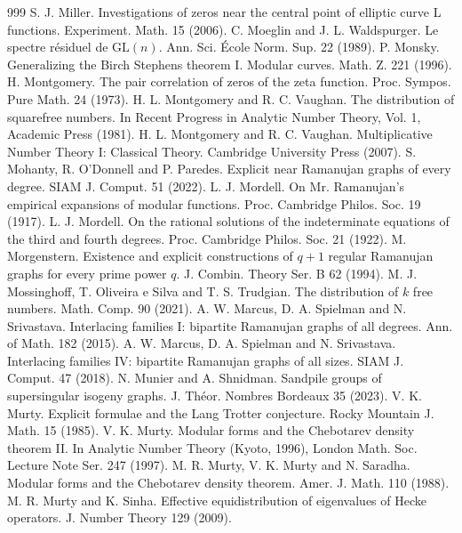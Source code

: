 \begin{thebibliography}{999}
 S. J. Miller. Investigations of zeros near the central point of elliptic curve L functions. Experiment. Math. 15 (2006).
 C. Moeglin and J. L. Waldspurger. Le spectre r\'esiduel de $\mathrm{GL}(n)$. Ann. Sci. \'Ecole Norm. Sup. 22 (1989).
 P. Monsky. Generalizing the Birch Stephens theorem I. Modular curves. Math. Z. 221 (1996).
 H. Montgomery. The pair correlation of zeros of the zeta function. Proc. Sympos. Pure Math. 24 (1973).
 H. L. Montgomery and R. C. Vaughan. The distribution of squarefree numbers. In Recent Progress in Analytic Number Theory, Vol. 1, Academic Press (1981).
 H. L. Montgomery and R. C. Vaughan. Multiplicative Number Theory I: Classical Theory. Cambridge University Press (2007).
 S. Mohanty, R. O'Donnell and P. Paredes. Explicit near Ramanujan graphs of every degree. SIAM J. Comput. 51 (2022).
 L. J. Mordell. On Mr. Ramanujan's empirical expansions of modular functions. Proc. Cambridge Philos. Soc. 19 (1917).
 L. J. Mordell. On the rational solutions of the indeterminate equations of the third and fourth degrees. Proc. Cambridge Philos. Soc. 21 (1922).
 M. Morgenstern. Existence and explicit constructions of $q+1$ regular Ramanujan graphs for every prime power $q$. J. Combin. Theory Ser. B 62 (1994).
 M. J. Mossinghoff, T. Oliveira e Silva and T. S. Trudgian. The distribution of $k$ free numbers. Math. Comp. 90 (2021).
 A. W. Marcus, D. A. Spielman and N. Srivastava. Interlacing families I: bipartite Ramanujan graphs of all degrees. Ann. of Math. 182 (2015).
 A. W. Marcus, D. A. Spielman and N. Srivastava. Interlacing families IV: bipartite Ramanujan graphs of all sizes. SIAM J. Comput. 47 (2018).
 N. Munier and A. Shnidman. Sandpile groups of supersingular isogeny graphs. J. Th\'eor. Nombres Bordeaux 35 (2023).
 V. K. Murty. Explicit formulae and the Lang Trotter conjecture. Rocky Mountain J. Math. 15 (1985).
 V. K. Murty. Modular forms and the Chebotarev density theorem II. In Analytic Number Theory (Kyoto, 1996), London Math. Soc. Lecture Note Ser. 247 (1997).
 M. R. Murty, V. K. Murty and N. Saradha. Modular forms and the Chebotarev density theorem. Amer. J. Math. 110 (1988).
 M. R. Murty and K. Sinha. Effective equidistribution of eigenvalues of Hecke operators. J. Number Theory 129 (2009).

\end{thebibliography}
